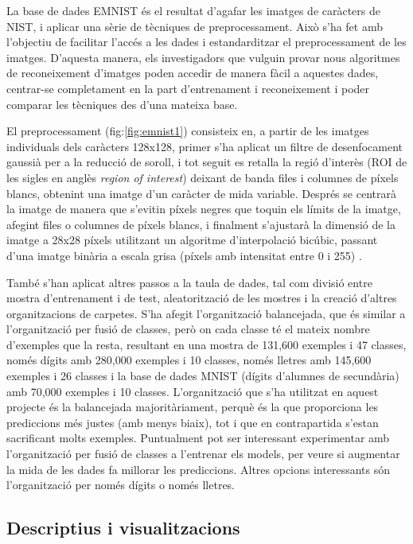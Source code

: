 \documentclass[12pt, spanish]{article}
\begin{document}
La base de dades EMNIST és el resultat d'agafar les imatges de caràcters de NIST, i aplicar una sèrie de tècniques de preprocessament. Això s'ha fet amb l'objectiu de facilitar l'accés a les dades i estandarditzar el preprocessament de les imatges. D'aquesta manera, els investigadors que vulguin provar nous algoritmes de reconeixement d'imatges poden accedir de manera fàcil a aquestes dades, centrar-se completament en la part d'entrenament  i reconeixement i poder comparar les tècniques des d'una mateixa base. 

El preprocessament (fig:\ref{fig:emnist1}) consisteix en, a partir de les imatges individuals dels caràcters 128x128, primer s'ha aplicat un filtre de desenfocament gaussià per a la reducció de soroll, i tot seguit es retalla la regió d'interès (ROI de les sigles en anglès \textit{region of interest}) deixant de banda files i columnes de píxels blancs, obtenint una imatge d'un caràcter de mida variable. Després se centrarà la imatge de manera que s'evitin píxels negres que toquin els límits de la imatge, afegint files o columnes de píxels blancs, i finalment s'ajustarà la dimensió de la imatge a 28x28 píxels utilitzant un algoritme d'interpolació bicúbic, passant d'una imatge binària a escala grisa (píxels amb intensitat entre 0 i 255)  \cite{EMNIST}.

També s'han aplicat altres passos a la taula de dades, tal com divisió entre mostra d'entrenament i de test, aleatorització de les mostres i la creació d'altres organitzacions de carpetes. S'ha afegit l'organització balancejada, que és similar a l'organització per fusió de classes, però on cada classe té el mateix nombre d'exemples que la resta, resultant en una mostra de 131,600 exemples i 47 classes, només dígits amb 280,000 exemples i 10 classes, només lletres amb 145,600 exemples i 26 classes i la base de dades MNIST (dígits d'alumnes de secundària) amb 70,000 exemples i 10 classes. L'organització que s'ha utilitzat en aquest projecte és la balancejada majoritàriament, perquè és la que proporciona les prediccions més justes (amb menys biaix), tot i que en contrapartida s'estan sacrificant molts exemples. Puntualment pot ser interessant experimentar amb l'organització per fusió de classes a l'entrenar els models, per veure si augmentar la mida de les dades fa millorar les prediccions. Altres opcions interessants són l'organització per només dígits o només lletres.


\subsection{Descriptius i visualitzacions}
\end{document}
